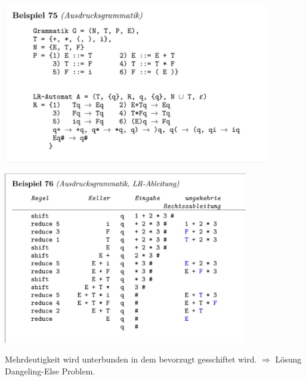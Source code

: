 \documentclass[
  ngerman
  ,12pt
  ,pdftex
]{article}
\begin{document}
\begin{center}
  \includegraphics[height=7cm]{image/Screenshot 2022-12-10 170319.jpg}
\end{center}
\begin{center}
  \includegraphics[height=7.5cm]{image/Screenshot 2022-12-10 170336.jpg}
\end{center}

Mehrdeutigkeit wird unterbunden in dem bevorzugt gesschiftet wird. $\Longrightarrow$ Lösung Dangeling-Else Problem.
\end{document}
